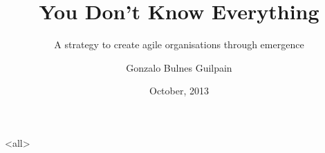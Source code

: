 \documentclass[ignorenonframetext]{beamer}
\author{Gonzalo Bulnes Guilpain}
\title[You Don't Know Everything]{You Don't Know Everything}
\subtitle{A strategy to create agile organisations through emergence}
\institute{Agiles2013, Lima, Peru}
\date{October, 2013}
\begin{document}
  \mode<all>
  
  \mode*
\end{document}
